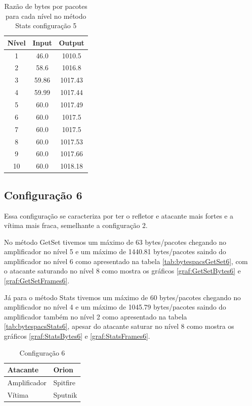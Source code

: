 \begin{table}[H]
\centering
\label{tab:bytespacsStats5}
\caption{Razão de bytes por pacotes para cada nível no método Stats configuração 5}
\begin{tabular}{|c|c|c|}
\hline
Nível & Input & Output  \\ \hline
1     & 46.0  & 1010.5  \\ \hline
2     & 58.6  & 1016.8  \\ \hline
3     & 59.86 & 1017.43 \\ \hline
4     & 59.99 & 1017.44 \\ \hline
5     & 60.0  & 1017.49 \\ \hline
6     & 60.0  & 1017.5  \\ \hline
7     & 60.0  & 1017.5  \\ \hline
8     & 60.0  & 1017.53 \\ \hline
9     & 60.0  & 1017.66 \\ \hline
10    & 60.0  & 1018.18 \\ \hline
\end{tabular}
\end{table}

\subsection*{Configuração 6}

Essa configuração se caracteriza por ter o refletor e atacante mais fortes e a vítima mais
fraca, semelhante a configuração 2.

No método GetSet tivemos um máximo de 63 bytes/pacotes chegando no amplificador no nível 5 e um máximo de 1440.81 bytes/pacotes saindo do amplificador no nível 6 como apresentado na tabela \ref{tab:bytespacsGetSet6}, com o atacante saturando no nível 8 como mostra os gráficos \ref{graf:GetSetBytes6} e \ref{graf:GetSetFrames6}.

Já para o método Stats tivemos um máximo de 60 bytes/pacotes chegando no amplificador no nível 4 e um máximo de 1045.79 bytes/pacotes saindo do amplificador também no nível 2 como apresentado na tabela \ref{tab:bytespacsStats6}, apesar do atacante saturar no nível 8 como mostra os gráficos \ref{graf:StatsBytes6} e \ref{graf:StatsFrames6}.

\begin{table}[H]
\centering
\caption{Configuração 6}
\begin{tabular}{|l|l|}
\hline
Atacante     & Orion    \\ \hline
Amplificador & Spitfire \\ \hline
Vítima       & Sputnik  \\ \hline
\end{tabular}
\end{table}

